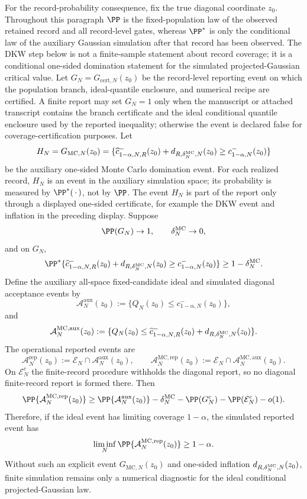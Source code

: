 \begin{lemma}
For the record-probability consequence, fix the true diagonal coordinate
\(z_0\).  Throughout this paragraph \(\PP\) is the fixed-population law of the
observed retained record and all record-level gates, whereas \(\PP^\ast\) is
only the conditional law of the auxiliary Gaussian simulation after that
record has been observed.  The DKW step below is not a finite-sample
statement about record coverage; it is a conditional one-sided domination
statement for the simulated projected-Gaussian critical value.  Let
\(G_N=G_{\mathrm{cert},N}(z_0)\) be the record-level reporting event on which
the population branch, ideal-quantile enclosure, and numerical recipe are
certified.  A finite report may set \(G_N=1\) only when the manuscript or
attached transcript contains the branch certificate and the ideal conditional
quantile enclosure used by the reported inequality; otherwise the event is
declared false for coverage-certification purposes.  Let
\[
H_N=G_{\mathrm{MC},N}(z_0)
=\{\widehat c^-_{1-\alpha,N,R}(z_0)
+d_{R,\delta_N^{\rm MC},N}(z_0)\ge c^-_{1-\alpha,N}(z_0)\}
\]
be the auxiliary one-sided Monte Carlo domination event.  For each realized
record, \(H_N\) is an event in the auxiliary simulation space; its probability
is measured by \(\PP^\ast(\,\cdot\,)\), not by \(\PP\).  The event \(H_N\) is
part of the report only through a displayed one-sided certificate, for example
the DKW event and inflation in the preceding display.  Suppose
\[
\PP(G_N)\to1,\qquad \delta_N^{\rm MC}\to0,
\]
and on \(G_N\),
\[
\PP^\ast\{\widehat c^-_{1-\alpha,N,R}(z_0)
+d_{R,\delta_N^{\rm MC},N}(z_0)\ge c^-_{1-\alpha,N}(z_0)\}
\ge1-\delta_N^{\rm MC} .
\]
Define the auxiliary all-space fixed-candidate ideal and simulated diagonal
acceptance events by
\[
\mathcal A_N^{\mathrm{aux}}(z_0)
:=\{Q_N(z_0)\le c^-_{1-\alpha,N}(z_0)\},
\]
and
\[
\mathcal A_N^{\mathrm{MC,aux}}(z_0)
:=\{Q_N(z_0)\le
\widehat c^-_{1-\alpha,N,R}(z_0)+d_{R,\delta_N^{\rm MC},N}(z_0)\}.
\]
The operational reported events are
\[
\mathcal A_N^{\mathrm{rep}}(z_0)
:=\mathcal E_N\cap\mathcal A_N^{\mathrm{aux}}(z_0),
\qquad
\mathcal A_N^{\mathrm{MC,rep}}(z_0)
:=\mathcal E_N\cap\mathcal A_N^{\mathrm{MC,aux}}(z_0).
\]
On \(\mathcal E_N^c\) the finite-record procedure withholds the diagonal
report, so no diagonal finite-record report is formed there.
Then
\[
\PP\{\mathcal A_N^{\mathrm{MC,rep}}(z_0)\}
\ge
\PP\{\mathcal A_N^{\mathrm{aux}}(z_0)\}
-\delta_N^{\rm MC}-\PP(G_N^c)-\PP(\mathcal E_N^c)-o(1).
\]
Therefore, if the ideal event has limiting coverage \(1-\alpha\), the simulated
reported event has
\[
\liminf_N
\PP\{\mathcal A_N^{\mathrm{MC,rep}}(z_0)\}
\ge1-\alpha .
\]
Without such an explicit event \(G_{\mathrm{MC},N}(z_0)\) and one-sided
inflation \(d_{R,\delta_N^{\rm MC},N}(z_0)\), finite simulation remains only a
numerical diagnostic for the ideal conditional projected-Gaussian law.
\end{lemma}

